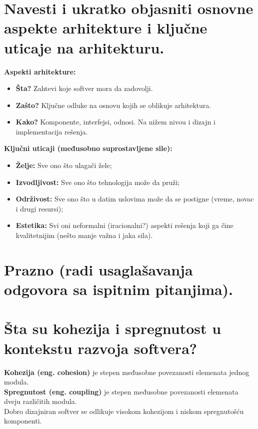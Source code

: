 \documentclass[a4paper]{article}
\begin{document}
\section{Navesti i ukratko objasniti osnovne aspekte arhitekture i ključne uticaje na arhitekturu.}
  \noindent \textbf{Aspekti arhitekture:}
  \begin{itemize}
    \item \textbf{Šta?} Zahtevi koje softver mora da zadovolji.
    \item \textbf{Zašto?} Ključne odluke na osnovu kojih se oblikuje arhitektura.
    \item \textbf{Kako?} Komponente, interfejsi, odnosi. Na nižem nivou i dizajn i implementacija
          rešenja.
  \end{itemize}
  \textbf{Ključni uticaji (međusobno suprostavljene sile):}
  \begin{itemize}
    \item \textbf{Želje:} Sve ono što ulagači žele;
    \item \textbf{Izvodljivost:} Sve ono što tehnologija može da pruži;
    \item \textbf{Održivost:} Sve ono što u datim uslovima može da se postigne 
          (vreme, novac i drugi resursi);
    \item \textbf{Estetika:} Svi oni neformalni (iracionalni?) aspekti rešenja koji ga čine
          kvalitetnijim (nešto manje važna i jaka sila).
  \end{itemize}

\section{Prazno (radi usaglašavanja odgovora sa ispitnim pitanjima).}

\section{Šta su kohezija i spregnutost u kontekstu razvoja softvera?}
  \textbf{Kohezija (eng. cohesion)} je stepen međusobne povezanosti elemenata jednog modula.\\

  \textbf{Spregnutost (eng. coupling)} je stepen međusobne povezanosti elemenata dveju različitih
  modula. \\

  Dobro dizajniran softver se odlikuje visokom kohezijom i niskom spregnutošću komponenti.
  \cite{gfg_coupling_and_cohesion}
  \cite{sjsu_coupling_and_cohesion}
\end{document}
